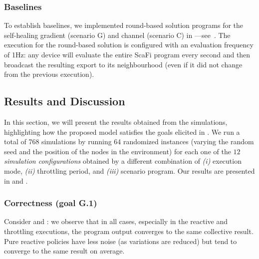 \subsubsection{Baselines}

To establish baselines, 
 we implemented round-based solution programs for the self-healing gradient (scenario G) and channel (scenario C) in \scafi{}---see~\cite{DBLP:journals/softx/CasadeiVAP22}. 
%
The execution for the round-based solution is configured 
 with an evaluation frequency of 1Hz: any device will evaluate the entire ScaFi program every second
 and then broadcast the resulting export to its neighbourhood (even if it did not change from the previous execution).

\subsection{Results and Discussion}\label{acsos2023-frp:eval:results}
%
In this section, we will present the results obtained from the simulations, 
 highlighting how the proposed model satisfies the goals elicited in .
%
We run a total of 768 simulations
by running 64 randomized instances
(varying the random seed and the position of the nodes in the environment)
for each one of the $12$ \emph{simulation configurations} obtained by a different combination of
\textit{(i)} execution mode,
\textit{(ii)} throttling period, and
\textit{(iii)} scenario program.
%
Our results are presented in  and .

\subsubsection{Correctness (goal G.1)} Consider  and :
 we observe that in all cases,
especially in the reactive and throttling executions,
 the program output converges to the same collective result.
%
Pure reactive policies have less noise (as variations are reduced)
 but tend to converge to the same result on average.

